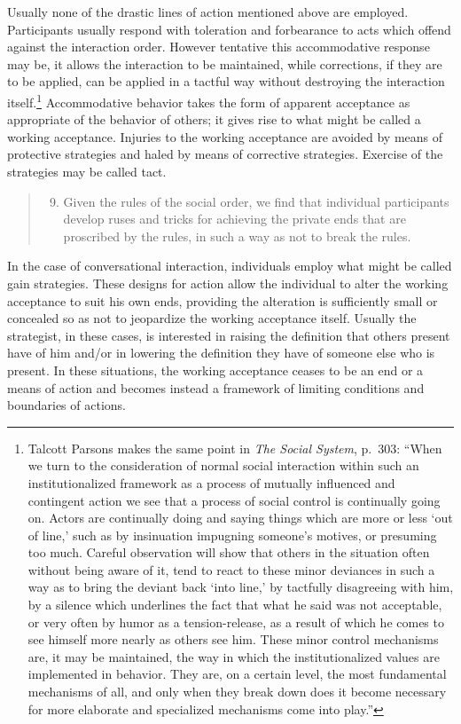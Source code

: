 \documentclass[twoside,symmetric,nobib,justified]{tufte-book}
\begin{document}
Usually none of the drastic lines of action mentioned above are
employed. Participants usually respond with toleration and forbearance
to acts which offend against the interaction order. However tentative
this accommodative response may be, it allows the interaction to be
maintained, while corrections, if they are to be applied, can be applied
in a tactful way without destroying the interaction itself.\footnote{Talcott
  Parsons makes the same point in \emph{The Social System}, p.~303:
  ``When we turn to the consideration of normal social interaction
  within such an institutionalized framework as a process of mutually
  influenced and contingent action we see that a process of social
  control is continually going on. Actors are continually doing and
  saying things which are more or less `out of line,' such as by
  insinuation impugning someone's motives, or presuming too much.
  Careful observation will show that others in the situation often
  without being aware of it, tend to react to these minor deviances in
  such a way as to bring the deviant back `into line,' by tactfully
  disagreeing with him, by a silence which underlines the fact that what
  he said was not acceptable, or very often by humor as a
  tension-release, as a result of which he comes to see himself more
  nearly as others see him. These minor control mechanisms are, it may
  be maintained, the way in which the institutionalized values are
  implemented in behavior. They are, on a certain level, the most
  fundamental mechanisms of all, and only when they break down does it
  become necessary for more elaborate and specialized mechanisms come
  into play.''} Accommodative behavior takes the form of apparent
acceptance as appropriate of the behavior of others; it gives rise to
what might be called a working acceptance. Injuries to the working
acceptance are avoided by means of protective strategies and haled by
means of corrective strategies. Exercise of the strategies may be called
tact.

\begin{quote}
\begin{enumerate}
\setcounter{enumi}{8}
\item
  Given the rules of the social order, we find that individual
  participants develop ruses and tricks for achieving the private ends
  that are proscribed by the rules, in such a way as not to break the
  rules.
\end{enumerate}
\end{quote}

\noindent In the case of conversational interaction, individuals employ what might
be called gain strategies. These designs for action allow the individual
to alter the working acceptance to suit his own ends, providing the
alteration is sufficiently small or concealed so as not to jeopardize
the working acceptance itself. Usually the strategist, in these cases,
is interested in raising the definition that others present have of him
and/or in lowering the definition they have of someone else who is
present. In these situations, the working acceptance ceases to be an end
or a means of action and becomes instead a framework of limiting
conditions and boundaries of actions.
\end{document}
